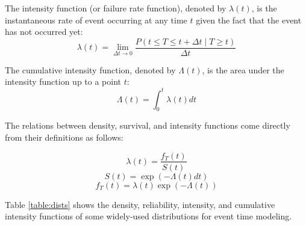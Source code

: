 \begin{definition}
The intensity function (or failure rate function), denoted by $\lambda(t)$, is the instantaneous rate of event occurring at any time $t$ given the fact that the event has not occurred yet:
\begin{equation}
    \lambda(t)=\lim_{\Delta t\rightarrow 0}\frac{P(t\le T\le t+\Delta t\mid T\ge t)}{\Delta t}
\end{equation}
\end{definition}

\begin{definition}
The cumulative intensity function, denoted by $\Lambda(t)$, is the area under the intensity function up to a point $t$:
\begin{equation}
    \Lambda(t)=\int_0^t\lambda(t)dt
\end{equation}
\end{definition}

The relations between density, survival, and intensity functions come directly from their definitions as follows:

\begin{equation}\label{eq:intensity}
    \lambda(t)=\frac{f_T(t)}{S(t)}
\end{equation}
\begin{equation}\label{eq:reliability}
    S(t)=\exp(-\Lambda(t)dt)
\end{equation}
\begin{equation}\label{eq:density}
    f_T(t)=\lambda(t)\exp(-\Lambda(t))
\end{equation}

Table \ref{table:dists} shows the density, reliability, intensity, and cumulative intensity functions of some widely-used distributions for event time modeling.